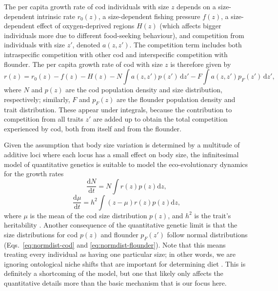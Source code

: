 \documentclass[9pt,twocolumn,twoside]{pnas-new}
\newcommand{\ud}{\text{d}}
\begin{document}
{The per capita growth rate of cod individuals with size $z$ depends on a size-dependent intrinsic rate $r_{0}(z)$, a size-dependent fishing pressure $f(z)$, a size-dependent effect of oxygen-deprived regions $H(z)$ (which affects bigger individuals more due to different food-seeking behaviour), and competition from individuals with size $z'$, denoted $a(z,z')$. The competition term includes both intraspecific competition with other cod and interspecific competition with flounder. The per capita growth rate of cod with size $z$ is therefore given by
\begin{equation}
  \label{eq:m_cod_r_z}
  r(z) = r_{0}(z) - f(z) - H(z) - N\int a(z,z') p(z') \,\ud z' - F\int a(z,z') p_F(z') \,\ud z',
\end{equation}
where $N$ and $p(z)$ are the cod population density and size distribution, respectively; similarly, $F$ and $p_F(z)$ are the flounder population density and trait distribution. These appear under integrals, because the contribution to competition from all traits $z'$ are added up to obtain the total competition experienced by cod, both from itself and from the flounder.

Given the assumption that body size variation is determined by a multitude of additive loci where each locus has a small effect on body size, the infinitesimal model of quantitative genetics \citep{Barton2017} is suitable to model the eco-evolutionary dynamics for the growth rates
\begin{equation}
\label{eq:m_N}
    \frac{\text{d}N}{\text{d}t} = N \int r(z) p(z) \text{d}z ,
\end{equation}
\begin{equation}
\label{eq:m_mu}
    \frac{\text{d}\mu}{\text{d}t} = h^{2} \int (z-\mu)r(z)p(z)\text{d}z,
\end{equation}
where $\mu$ is the mean of the cod size distribution $p(z)$, and $h^{2}$ is the trait's heritability \citep{Barabas2016, Pastore2021}. Another consequence of the quantitative genetic limit is that the size distributions for cod $p(z)$ and flounder $p_{F}(z')$ follow normal distributions (Eqs.~\ref{eq:normdist-cod} and \ref{eq:normdist-flounder}). Note that this means treating every individual as having one particular size; in other words, we are ignoring ontological niche shifts that are important for determining diet \citep{WernerGilliam1984}. This is definitely a shortcoming of the model, but one that likely only affects the quantitative details more than the basic mechanism that is our focus here.

}
\end{document}
